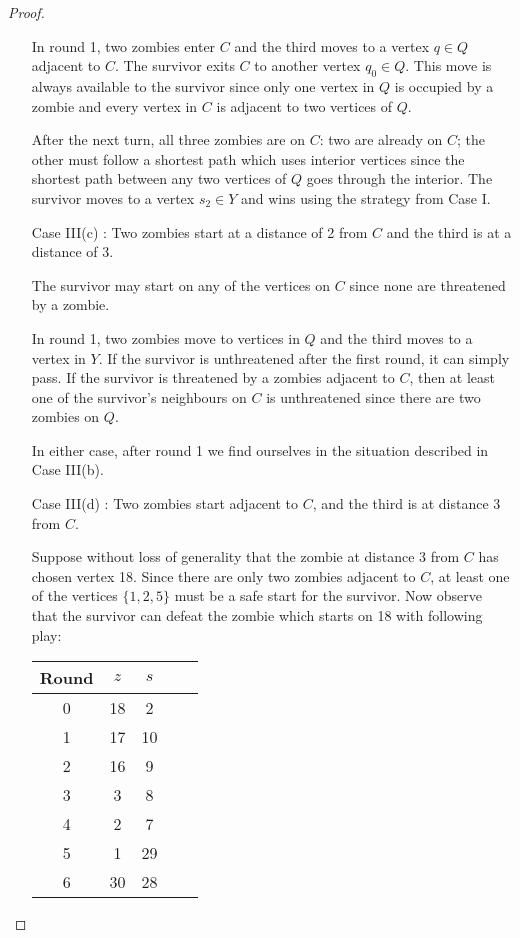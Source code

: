 \begin{proof}
\begin{enumerate}[I.]
In round 1, two zombies enter $C$ and the third moves to a vertex $q \in Q$ adjacent to $C$.
The survivor exits $C$ to another vertex $q_0 \in Q$. This move is always available to the survivor since only one vertex in $Q$ is occupied by
a zombie and every vertex in $C$ is adjacent to two vertices of $Q$.

After the next turn, all three zombies are on $C$: two are already on $C$; the other must follow a shortest path which uses interior vertices since the shortest path between any two vertices of $Q$ goes through the interior. The survivor moves to a vertex $s_2 \in Y$ and wins using the strategy from Case I.

\item[Case III(c)]: Two zombies start at a distance of 2 from $C$ and the third is at a distance of 3.

The survivor may start on any of the vertices on $C$ since none are threatened by a zombie.

In round 1, two zombies move to vertices in $Q$ and the third moves to a vertex in $Y$. If the survivor is unthreatened after the first round, it can simply pass.
If the survivor is threatened by a zombies adjacent to $C$, then at least one of the survivor's neighbours on $C$ is unthreatened since there are two zombies on $Q$.

In either case, after round 1 we find ourselves in the situation described in Case III(b).

\item[Case III(d)]: Two zombies start adjacent to $C$, and the third is at distance 3 from $C$.

Suppose without loss of generality that the zombie at distance 3 from $C$ has chosen vertex 18.
Since there are only two zombies adjacent to $C$, at least one of the vertices $\{1, 2, 5\}$ must be a safe start for the survivor. Now observe that the survivor can defeat the zombie which starts on 18 with following play:

\begin{tabular}{c | c | c | c | c }
Round & $z$ & $s$ \\
\hline
0 & 18 & 2 \\
1 & 17 & 10 \\
2 & 16 & 9 \\
3 & 3 & 8 \\
4 & 2 & 7 \\
5 & 1 & 29 \\
6 & 30 & 28
\end{tabular}


\end{enumerate}
\end{proof}
